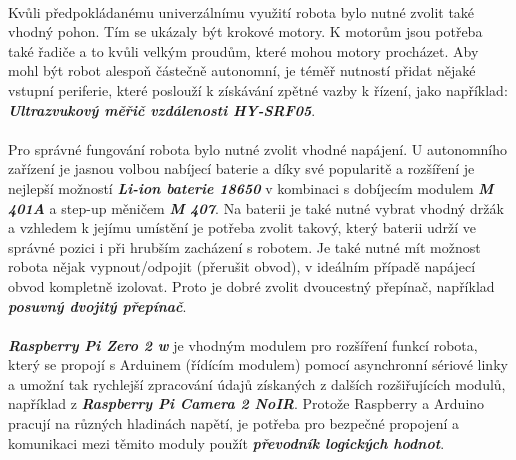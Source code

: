 \documentclass[12pt]{article}
\begin{document}
\begin{spacing}{1.5}
	\paragraph{} Kvůli předpokládanému univerzálnímu využití robota bylo nutné zvolit také vhodný pohon. Tím se ukázaly být krokové motory. K motorům jsou potřeba také řadiče a to kvůli velkým proudům, které mohou motory procházet.
	Aby mohl být robot alespoň částečně autonomní, je téměř nutností přidat nějaké vstupní periferie, které poslouží k získávání zpětné vazby k řízení, jako například: \textbf{\textit{Ultrazvukový měřič vzdálenosti HY-SRF05}}.
	
	\paragraph{} Pro správné fungování robota bylo nutné zvolit vhodné napájení. U autonomního zařízení je jasnou volbou nabíjecí baterie a díky své popularitě a rozšíření je nejlepší možností \textbf{\textit{Li-ion baterie 18650}} v kombinaci s dobíjecím modulem \textbf{\textit{M 401A}} a step-up měničem \textbf{\textit{M 407}}.
	Na baterii je také nutné vybrat vhodný držák a vzhledem k jejímu umístění je potřeba zvolit takový, který baterii udrží ve správné pozici i při hrubším zacházení s robotem.
	Je také nutné mít možnost robota nějak vypnout/odpojit (přerušit obvod), v ideálním případě napájecí obvod kompletně izolovat. Proto je dobré zvolit dvoucestný přepínač, například \textit{\textbf{posuvný dvojitý přepínač}}.
	
	\paragraph{} \textbf{\textit{Raspberry Pi Zero 2 w}} je vhodným modulem pro rozšíření funkcí robota, který se propojí s Arduinem (řídícím modulem) pomocí asynchronní sériové linky a umožní tak rychlejší zpracování údajů získaných z dalších rozšiřujících modulů, například z \textbf{\textit{Raspberry Pi Camera 2 NoIR}}. Protože Raspberry a Arduino pracují na různých hladinách napětí, je potřeba pro bezpečné propojení a komunikaci mezi těmito moduly použít \textit{\textbf{převodník logických hodnot}}.
	

\end{spacing}
\end{document}
